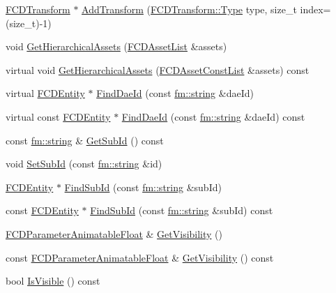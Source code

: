 \begin{DoxyCompactItemize}
\item 
\hyperlink{classFCDTransform}{FCDTransform} $\ast$ \hyperlink{classFCDSceneNode_a863250572e5a4dbf022192c653222d94}{AddTransform} (\hyperlink{classFCDTransform_a13e561c5e53aeaf84dedf4661cdc8921}{FCDTransform::Type} type, size\_\-t index=(size\_\-t)-\/1)
\item 
void \hyperlink{classFCDSceneNode_aeab0e88d0beeb832bd1b5fd457700c45}{GetHierarchicalAssets} (\hyperlink{classfm_1_1pvector}{FCDAssetList} \&assets)
\item 
virtual void \hyperlink{classFCDSceneNode_ae3b739c9548ec44effd945a30590098f}{GetHierarchicalAssets} (\hyperlink{classfm_1_1pvector}{FCDAssetConstList} \&assets) const 
\item 
virtual \hyperlink{classFCDEntity}{FCDEntity} $\ast$ \hyperlink{classFCDSceneNode_ab4963aa56327cbb6b6d871d1483f4f43}{FindDaeId} (const \hyperlink{classfm_1_1stringT}{fm::string} \&daeId)
\item 
virtual const \hyperlink{classFCDEntity}{FCDEntity} $\ast$ \hyperlink{classFCDSceneNode_a55654ef3acc406b4ca7d1aafda9edcce}{FindDaeId} (const \hyperlink{classfm_1_1stringT}{fm::string} \&daeId) const 
\item 
const \hyperlink{classfm_1_1stringT}{fm::string} \& \hyperlink{classFCDSceneNode_a13704a88612d130a6fb93c9795340508}{GetSubId} () const 
\item 
void \hyperlink{classFCDSceneNode_a1c122c00f8c75a74228043cdb584e6ba}{SetSubId} (const \hyperlink{classfm_1_1stringT}{fm::string} \&id)
\item 
\hyperlink{classFCDEntity}{FCDEntity} $\ast$ \hyperlink{classFCDSceneNode_a662b611fcb6becf807c61f2271a0dd90}{FindSubId} (const \hyperlink{classfm_1_1stringT}{fm::string} \&subId)
\item 
const \hyperlink{classFCDEntity}{FCDEntity} $\ast$ \hyperlink{classFCDSceneNode_a044b42776197433885e2950ba7531f9d}{FindSubId} (const \hyperlink{classfm_1_1stringT}{fm::string} \&subId) const 
\item 
\hyperlink{classFCDParameterAnimatableT}{FCDParameterAnimatableFloat} \& \hyperlink{classFCDSceneNode_aa433451cde90a143a376d1fa8d62b42b}{GetVisibility} ()
\item 
const \hyperlink{classFCDParameterAnimatableT}{FCDParameterAnimatableFloat} \& \hyperlink{classFCDSceneNode_a4f7afd39c98b61b80dc3cbee97b3f132}{GetVisibility} () const 
\item 
bool \hyperlink{classFCDSceneNode_ac8302f5ea740d300e9525cef4afd40a3}{IsVisible} () const 
\item 

\end{DoxyCompactItemize}
